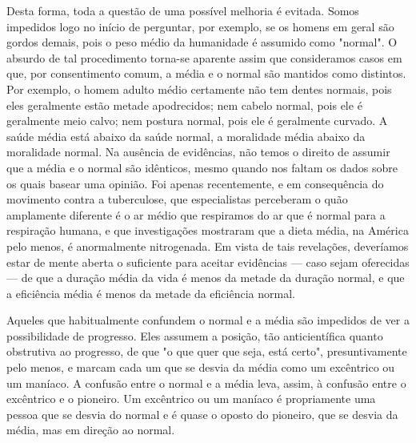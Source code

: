 \documentclass[12pt]{article}
\begin{document}
Desta forma, toda a questão de uma possível melhoria é evitada. Somos impedidos logo no início de perguntar, por exemplo, se os homens em geral são gordos demais, pois o peso médio da humanidade é assumido como "normal". O absurdo de tal procedimento torna-se aparente assim que consideramos casos em que, por consentimento comum, a média e o normal são mantidos como distintos. Por exemplo, o homem adulto médio certamente não tem dentes normais, pois eles geralmente estão metade apodrecidos; nem cabelo normal, pois ele é geralmente meio calvo; nem postura normal, pois ele é geralmente curvado. A saúde média está abaixo da saúde normal, a moralidade média abaixo da moralidade normal. Na ausência de evidências, não temos o direito de assumir que a média e o normal são idênticos, mesmo quando nos faltam os dados sobre os quais basear uma opinião. Foi apenas recentemente, e em consequência do movimento contra a tuberculose, que especialistas perceberam o quão amplamente diferente é o ar médio que respiramos do ar que é normal para a respiração humana, e que investigações mostraram que a dieta média, na América pelo menos, é anormalmente nitrogenada. Em vista de tais revelações, deveríamos estar de mente aberta o suficiente para aceitar evidências — caso sejam oferecidas — de que a duração média da vida é menos da metade da duração normal, e que a eficiência média é menos da metade da eficiência normal.

Aqueles que habitualmente confundem o normal e a média são impedidos de ver a possibilidade de progresso. Eles assumem a posição, tão anticientífica quanto obstrutiva ao progresso, de que "o que quer que seja, está certo", presuntivamente pelo menos, e marcam cada um que se desvia da média como um excêntrico ou um maníaco. A confusão entre o normal e a média leva, assim, à confusão entre o excêntrico e o pioneiro. Um excêntrico ou um maníaco é propriamente uma pessoa que se desvia do normal e é quase o oposto do pioneiro, que se desvia da média, mas em direção ao normal.
\end{document}
